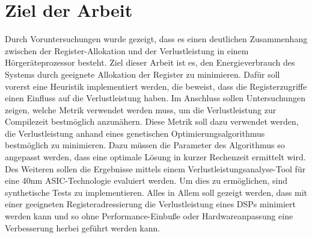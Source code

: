 \section{Ziel der Arbeit}
\label{sec:ziele}
Durch Voruntersuchungen wurde gezeigt, dass es einen deutlichen Zusammenhang zwischen der Register-Allokation und der Verlustleistung in einem Hörgeräteprozessor besteht. Ziel dieser Arbeit ist es, den Energieverbrauch des Systems durch geeignete Allokation der Register zu minimieren. Dafür soll vorerst eine Heuristik implementiert werden, die beweist, dass die Registerzugriffe einen Einfluss auf die Verlustleistung haben. Im Anschluss sollen Untersuchungen zeigen, welche Metrik verwendet werden muss, um die Verlustleistung zur Compilezeit bestmöglich anzunähern. Diese Metrik soll dazu verwendet werden, die Verlustleistung anhand eines genetischen Optimierungsalgorithmus bestmöglich zu minimieren. Dazu müssen die Parameter des Algorithmus so angepasst werden, dass eine optimale Lösung in kurzer Rechenzeit ermittelt wird. Des Weiteren sollen die Ergebnisse mittels einem Verlustleistungsanalyse-Tool für eine 40nm ASIC-Technologie evaluiert werden. Um dies zu ermöglichen, sind synthetische Tests zu implementieren. Alles in Allem soll gezeigt werden, dass mit einer geeigneten Registeradressierung die Verlustleistung eines DSPs minimiert werden kann und so ohne Performance-Einbuße oder Hardwareanpassung eine Verbesserung herbei geführt werden kann.

%
